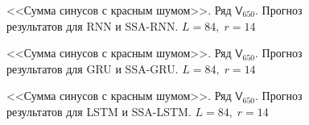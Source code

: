 \documentclass[specialist,
               substylefile = spbu.rtx,
               subf,href,colorlinks=true, 12p]{disser}
\begin{document}
\begin{figure}[H]
	\captionsetup{justification=centering}
	\caption{<<Сумма синусов с красным шумом>>. Ряд $\mathsf{V}_{650}$. Прогноз результатов для RNN и SSA-RNN. $L = 84, \; r = 14$}
\end{figure}

\begin{figure}[H]
	\captionsetup{justification=centering}
	\caption{<<Сумма синусов с красным шумом>>. Ряд $\mathsf{V}_{650}$. Прогноз результатов для GRU и SSA-GRU. $L = 84, \; r = 14$}
	\label{serr_r14_res_gru}
\end{figure}

\begin{figure}[H]
	\captionsetup{justification=centering}
	\caption{<<Сумма синусов с красным шумом>>. Ряд $\mathsf{V}_{650}$. Прогноз результатов для LSTM и SSA-LSTM. $L = 84, \; r = 14$}
	\label{serr_r14_res_lstm}
\end{figure}
\end{document}
